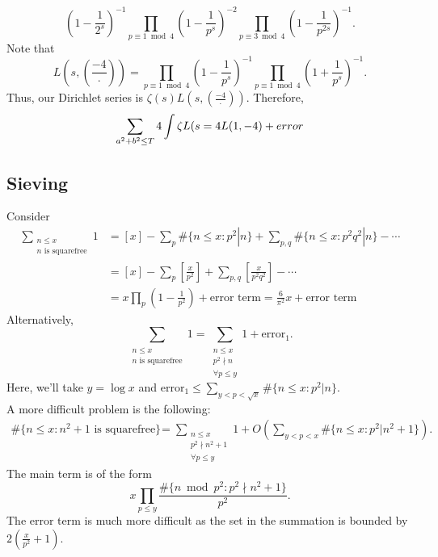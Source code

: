 \begin{equation*}
\left(1-\frac{1}{2^{s}}\right)^{-1}\prod_{p \equiv 1 \bmod{4}}\left(1-\frac{1}{p^{s}}\right)^{-2}\prod_{p \equiv 3 \bmod{4}}\left(1-\frac{1}{p^{2s}}\right)^{-1}.
\end{equation*}
Note that
\begin{equation*}
L\left(s,\left(\frac{-4}{\cdot}\right)\right)=\prod_{p \equiv 1 \bmod{4}}\left(1-\frac{1}{p^{s}}\right)^{-1}\prod_{p \equiv 1 \bmod{4}}\left(1+\frac{1}{p^{s}}\right)^{-1}.
\end{equation*}
Thus, our Dirichlet series is $\zeta(s)L\left(s,\left(\frac{-4}{\cdot}\right)\right)$.  Therefore,
\begin{equation*}
\sum_{a^{2}+b^{2} \le T} 4 \int \zeta L(s \\
=4 L(1,-4)+error
\end{equation*}

\subsection{Sieving}

Consider
\begin{align*}
\sum_{\substack{n \le x \\ n \text{ is squarefree}}} 1 &= [x]-\sum_{p} \#\{n \le x:p^{2}|n\}+\sum_{p,q} \#\{n \le x:p^{2}q^{2}|n\}-\dotsb \\
&=[x]-\sum_{p} \left[\frac{x}{p^{2}}\right] +\sum_{p,q} \left[\frac{x}{p^{2}q^{2}}\right]-\dotsb \\
&= x\prod_{p}\left(1-\frac{1}{p^{2}}\right)+\text{error term}=\frac{6}{\pi^{2}}x+\text{error term}
\end{align*}
Alternatively,
\begin{equation*}
\sum_{\substack{n \le x \\ n \text{ is squarefree}}} 1 = \sum_{\substack{n \le x \\ p^{2} \nmid n \\ \forall p \le y}}1+\text{error}_{1}.
\end{equation*}
Here, we'll take $y=\log x$ and $\text{error}_{1} \le \sum\limits_{y < p < \sqrt{x}} \#\{n \le x:p^{2}|n\}$.\\
\indent A more difficult problem is the following:
\begin{align*}
\#\{n \le x: n^{2}+1 \text{ is squarefree}\} &= \sum_{\substack{n \le x \\ p^{2} \nmid n^{2}+1 \\ \forall p \le y}} 1+O\left(\sum_{y < p < x} \#\{n \le x: p^{2}|n^{2}+1\}\right).
\end{align*}
The main term is of the form
\begin{equation*}
x\prod_{p \le y} \frac{\#\{n \bmod{p^{2}}:p^{2} \nmid n^{2}+1\}}{p^{2}}.
\end{equation*}
The error term is much more difficult as the set in the summation is bounded by $2\left(\frac{x}{p^{2}}+1\right)$.

